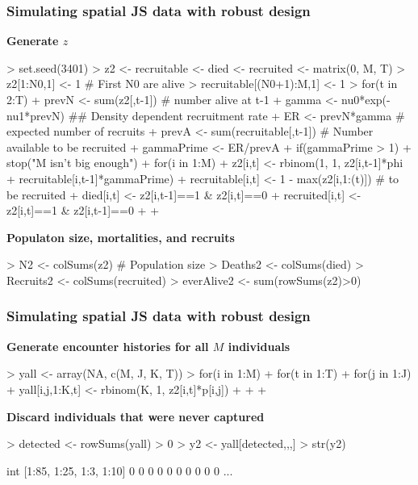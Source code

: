 \documentclass[color=usenames,dvipsnames]{beamer}
\begin{document}
\begin{frame}[fragile]
  \frametitle{Simulating spatial JS data with robust design}
{\bf Generate $z$}
\scriptsize
\begin{Schunk}
\begin{Sinput}
> set.seed(3401)
> z2 <- recruitable <- died <- recruited <- matrix(0, M, T)
> z2[1:N0,1] <- 1 # First N0 are alive
> recruitable[(N0+1):M,1] <- 1
> for(t in 2:T) {
+     prevN <- sum(z2[,t-1]) # number alive at t-1
+     gamma <- nu0*exp(-nu1*prevN) ## Density dependent recruitment rate
+     ER <- prevN*gamma # expected number of recruits
+     prevA <- sum(recruitable[,t-1]) # Number available to be recruited
+     gammaPrime <- ER/prevA
+     if(gammaPrime > 1)
+         stop("M isn't big enough")
+     for(i in 1:M) {
+         z2[i,t] <- rbinom(1, 1, z2[i,t-1]*phi + recruitable[i,t-1]*gammaPrime)
+         recruitable[i,t] <- 1 - max(z2[i,1:(t)]) # to be recruited
+         died[i,t] <- z2[i,t-1]==1 & z2[i,t]==0
+         recruited[i,t] <- z2[i,t]==1 & z2[i,t-1]==0
+     }
+ }
\end{Sinput}
\end{Schunk}
\pause
\vfill
{\bf \normalsize Populaton size, mortalities, and recruits}
\begin{Schunk}
\begin{Sinput}
> N2 <- colSums(z2) # Population size
> Deaths2 <- colSums(died)
> Recruits2 <- colSums(recruited)
> everAlive2 <- sum(rowSums(z2)>0)
\end{Sinput}
\end{Schunk}
\end{frame}









\begin{frame}[fragile]
  \frametitle{Simulating spatial JS data with robust design}
{\bf Generate encounter histories for all $M$ individuals}
\footnotesize
\begin{Schunk}
\begin{Sinput}
> yall <- array(NA, c(M, J, K, T))
> for(i in 1:M) {
+     for(t in 1:T) {
+         for(j in 1:J) {
+             yall[i,j,1:K,t] <- rbinom(K, 1, z2[i,t]*p[i,j])
+         }
+     }
+ }
\end{Sinput}
\end{Schunk}
\pause
\vfill
{\bf \normalsize Discard individuals that were never captured}
\begin{Schunk}
\begin{Sinput}
> detected <- rowSums(yall) > 0
> y2 <- yall[detected,,,]
> str(y2)
\end{Sinput}
\begin{Soutput}
 int [1:85, 1:25, 1:3, 1:10] 0 0 0 0 0 0 0 0 0 0 ...
\end{Soutput}
\end{Schunk}
\end{frame}
\end{document}

